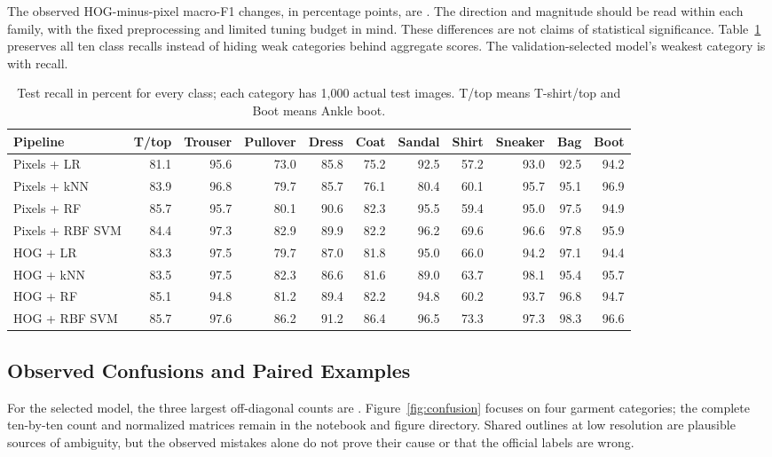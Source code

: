 \documentclass[conference]{IEEEtran}
\begin{document}
The observed HOG-minus-pixel macro-F1 changes, in percentage points, are
\DeltaText{}. The direction and magnitude should be read within each family,
with the fixed preprocessing and limited tuning budget in mind. These differences
are not claims of statistical significance. Table~\ref{tab:recall} preserves
all ten class recalls instead of hiding weak categories behind aggregate scores.
The validation-selected model's weakest category is \WeakClass{} with
\WeakRecall{} recall.

\begin{table}[t]
\caption{Test recall in percent for every class; each category has 1,000 actual
test images. T/top means T-shirt/top and Boot means Ankle boot.}
\label{tab:recall}\centering\small\setlength{\tabcolsep}{4pt}
\begin{tabular}{lrrrrrrrrrr}\toprule
Pipeline & T/top & Trouser & Pullover & Dress & Coat & Sandal & Shirt & Sneaker & Bag & Boot\\\midrule
Pixels + LR & 81.1 & 95.6 & 73.0 & 85.8 & 75.2 & 92.5 & 57.2 & 93.0 & 92.5 & 94.2 \\
Pixels + kNN & 83.9 & 96.8 & 79.7 & 85.7 & 76.1 & 80.4 & 60.1 & 95.7 & 95.1 & 96.9 \\
Pixels + RF & 85.7 & 95.7 & 80.1 & 90.6 & 82.3 & 95.5 & 59.4 & 95.0 & 97.5 & 94.9 \\
Pixels + RBF SVM & 84.4 & 97.3 & 82.9 & 89.9 & 82.2 & 96.2 & 69.6 & 96.6 & 97.8 & 95.9 \\
HOG + LR & 83.3 & 97.5 & 79.7 & 87.0 & 81.8 & 95.0 & 66.0 & 94.2 & 97.1 & 94.4 \\
HOG + kNN & 83.5 & 97.5 & 82.3 & 86.6 & 81.6 & 89.0 & 63.7 & 98.1 & 95.4 & 95.7 \\
HOG + RF & 85.1 & 94.8 & 81.2 & 89.4 & 82.2 & 94.8 & 60.2 & 93.7 & 96.8 & 94.7 \\
HOG + RBF SVM & 85.7 & 97.6 & 86.2 & 91.2 & 86.4 & 96.5 & 73.3 & 97.3 & 98.3 & 96.6 \\
\bottomrule\end{tabular}
\end{table}

\subsection{Observed Confusions and Paired Examples}
For the selected model, the three largest off-diagonal counts are
\ConfusionText{}. Figure~\ref{fig:confusion} focuses on four garment categories;
the complete ten-by-ten count and normalized matrices remain in the notebook
and figure directory. Shared outlines at low resolution are plausible sources
of ambiguity, but the observed mistakes alone do not prove their cause or
that the official labels are wrong.
\end{document}
